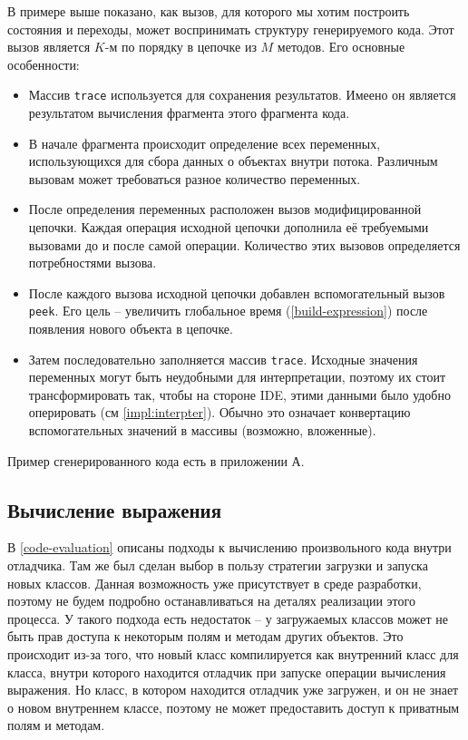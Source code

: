 В примере выше показано, как вызов, для которого мы хотим построить состояния и переходы, может воспринимать структуру генерируемого кода. Этот вызов является $K$-м по порядку в цепочке из $M$ методов. Его основные особенности:
\begin{itemize}
	\item Массив \texttt{trace} используется для сохранения результатов. Имеено он является результатом вычисления фрагмента этого фрагмента кода.
	\item В начале фрагмента происходит определение всех переменных, использующихся для сбора данных о объектах внутри потока. Различным вызовам может требоваться разное количество переменных.
	\item После определения переменных расположен вызов модифицированной цепочки. Каждая операция исходной цепочки дополнила её требуемыми вызовами до и после самой операции. Количество этих вызовов определяется потребностями вызова.
	\item После каждого вызова исходной цепочки добавлен вспомогательный вызов \texttt{peek}. Его цель -- увеличить глобальное время (\ref{build-expression}) после появления нового объекта в цепочке. 
	\item Затем последовательно заполняется массив \texttt{trace}. Исходные значения переменных могут быть неудобными для интерпретации, поэтому их стоит трансформировать так, чтобы на стороне IDE, этими данными было удобно оперировать (см \ref{impl:interpter}). Обычно это означает конвертацию вспомогательных значений в массивы (возможно, вложенные).
\end{itemize}

Пример сгенерированного кода есть в приложении А.

\subsection{Вычисление выражения}
В \ref{code-evaluation} описаны подходы к вычислению произвольного кода внутри отладчика. Там же был сделан выбор в пользу стратегии загрузки и запуска новых классов. Данная возможность уже присутствует в среде разработки, поэтому не будем подробно останавливаться на деталях реализации этого процесса. У такого подхода есть недостаток -- у загружаемых классов может не быть прав доступа к некоторым полям и методам других объектов. Это происходит из-за того, что новый класс компилируется как внутренний класс для класса, внутри которого находится отладчик при запуске операции вычисления выражения. Но класс, в котором находится отладчик уже загружен, и он не знает о новом внутреннем классе, поэтому не может предоставить доступ к приватным полям и методам.

